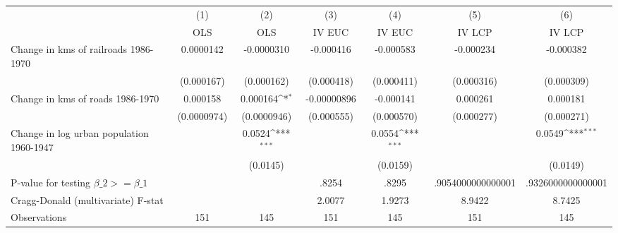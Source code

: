 {
\def\sym#1{\ifmmode^{#1}\else\(^{#1}\)\fi}
\begin{tabular}{l*{6}{c}}
\hline\hline
                &\multicolumn{1}{c}{(1)}&\multicolumn{1}{c}{(2)}&\multicolumn{1}{c}{(3)}&\multicolumn{1}{c}{(4)}&\multicolumn{1}{c}{(5)}&\multicolumn{1}{c}{(6)}\\
                &\multicolumn{1}{c}{OLS}&\multicolumn{1}{c}{OLS}&\multicolumn{1}{c}{IV EUC}&\multicolumn{1}{c}{IV EUC}&\multicolumn{1}{c}{IV LCP}&\multicolumn{1}{c}{IV LCP}\\
\hline
Change in kms of railroads 1986-1970&0.0000142         &-0.0000310         &-0.000416         &-0.000583         &-0.000234         &-0.000382         \\
                &(0.000167)         &(0.000162)         &(0.000418)         &(0.000411)         &(0.000316)         &(0.000309)         \\
[1em]
Change in kms of roads 1986-1970& 0.000158         & 0.000164\sym{*}  &-0.00000896         &-0.000141         & 0.000261         & 0.000181         \\
                &(0.0000974)         &(0.0000946)         &(0.000555)         &(0.000570)         &(0.000277)         &(0.000271)         \\
[1em]
Change in log urban population 1960-1947&                  &   0.0524\sym{***}&                  &   0.0554\sym{***}&                  &   0.0549\sym{***}\\
                &                  & (0.0145)         &                  & (0.0159)         &                  & (0.0149)         \\
\hline
P-value for testing $\beta\_{2} >= \beta\_{1}$&                  &                  &    .8254         &    .8295         &.9054000000000001         &.9326000000000001         \\
Cragg-Donald (multivariate) F-stat&                  &                  &   2.0077         &   1.9273         &   8.9422         &   8.7425         \\
Observations    &      151         &      145         &      151         &      145         &      151         &      145         \\
\hline\hline
\end{tabular}
}
